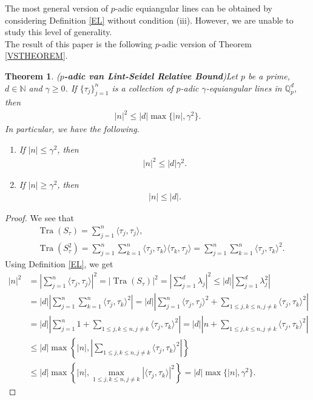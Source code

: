\documentclass{amsart}
\newtheorem{theorem}{Theorem}[section]
\begin{document}
The most general version of $p$-adic equiangular lines can be obtained by considering Definition \ref{EL} without condition (iii). However, we are unable to study this level of generality.\\
The result of this  paper is the following $p$-adic version of Theorem \ref{VSTHEOREM}.
\begin{theorem} (\textbf{$p$-adic van Lint-Seidel  Relative Bound})\label{PE}
	Let $p$ be a prime, $d \in \mathbb{N}$ and $\gamma \geq 0$. If $\{\tau_j\}_{j=1}^n$  is a collection of $p$-adic  $\gamma$-equiangular lines in $\mathbb{Q}^d_p$, then 
	\begin{align*}
		|n|^2\leq |d|\max\{|n|, \gamma^2 \}.
	\end{align*}
In particular, we have the following. 
\begin{enumerate}[\upshape(i)]
	\item If $|n|\leq \gamma^2$, then 
	\begin{align*}
		|n|^2\leq |d|\gamma^2.
	\end{align*}
\item If $|n|\geq \gamma^2$, then 
\begin{align*}
	|n|\leq |d|.
\end{align*}
\end{enumerate}
\end{theorem}
\begin{proof}
   We see that 
\begin{align*}
	&\operatorname{Tra}(S_{\tau})=\sum_{j=1}^n\langle \tau_j, \tau_j \rangle , \\
	& \operatorname{Tra}(S^2_{\tau})=\sum_{j=1}^n\sum_{k=1}^n\langle \tau_j, \tau_k \rangle\langle \tau_k, \tau_j \rangle=\sum_{j=1}^n\sum_{k=1}^n\langle \tau_j, \tau_k \rangle^2.
\end{align*}	
Using Definition \ref{EL}, we get
\begin{align*}
	|n|^2&= \left|\sum_{j=1}^n\langle \tau_j, \tau_j \rangle \right|^2=|\operatorname{Tra}(S_{\tau})|^2=\left|\sum_{j=1}^{d}\lambda_j\right|^2\leq |d| \left|\sum_{j=1}^{d}\lambda_j^2\right|\\
	&=|d|\left|\sum_{j=1}^n\sum_{k=1}^n\langle \tau_j, \tau_k \rangle^2\right|
	=|d|\left|\sum_{j=1}^n\langle \tau_j, \tau_j \rangle^2+\sum_{1\leq j, k \leq n, j \neq k}\langle \tau_j, \tau_k \rangle^2\right|\\
	&=|d|\left|\sum_{j=1}^n1+\sum_{1\leq j, k \leq n, j \neq k}\langle \tau_j, \tau_k \rangle^2\right|=|d|\left|n+\sum_{1\leq j, k \leq n, j \neq k}\langle \tau_j, \tau_k \rangle^2\right|\\
	&\leq |d| \max\left\{|n|, \left|\sum_{1\leq j, k \leq n, j \neq k}\langle \tau_j, \tau_k \rangle^2\right|\right\}\\
	&\leq |d| \max\left\{|n|, \max_{1\leq j,k \leq n, j \neq k}|\langle \tau_j,\tau_k\rangle |^2\right\}= |d|\max\{|n|, \gamma^2 \}.
\end{align*}
\end{proof}
\end{document}
